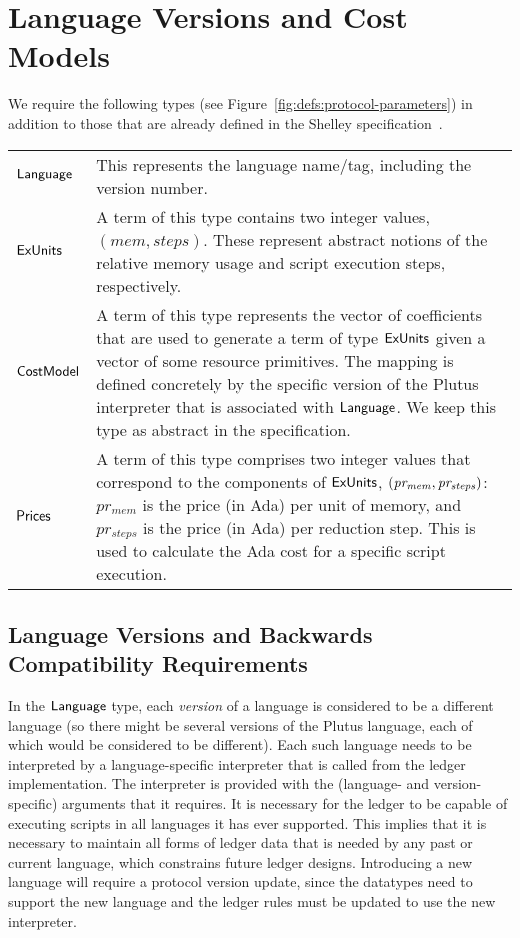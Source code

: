 \section{Language Versions and Cost Models}
\label{sec:protocol-parameters}

We require the following types (see Figure~\ref{fig:defs:protocol-parameters})
in addition to those that are already defined in the Shelley specification~\cite{shelley_spec}.

\vspace{12pt}
\begin{tabular}{lp{5in}}
  $\mathsf{Language}$ &
  This represents the language name/tag, including the
  version number.
  \\
  $\mathsf{ExUnits}$ &
  A term of this type contains two integer values,
  $(mem, steps)$.
  These represent abstract notions of the relative memory usage and script execution steps,
  respectively.
  \\
  $\mathsf{CostModel}$ &
  A term of this type represents the vector of coefficients that are used to generate
  a term of type $\mathsf{ExUnits}$ given a vector of some resource primitives. The mapping is defined
  concretely by the specific version of the Plutus interpreter that is associated with $\mathsf{Language}$.
  We keep this type as abstract in the specification.
  \\
  $\mathsf{Prices}$ &
  A term of this type comprises two integer values that correspond to the components of $\mathsf{ExUnits}$,
  $\mathit{(pr_{mem}, pr_{steps})}$:
  $pr_{mem}$ is the price (in Ada) per unit of memory, and $pr_{steps}$ is the price (in Ada) per
  reduction step. This is used to calculate the Ada cost for a specific script execution.
\end{tabular}

\subsection{Language Versions and Backwards Compatibility Requirements}
\label{sec:versions}

In the $\mathsf{Language}$ type, each \emph{version} of a language is considered to be a different language (so there might be several versions of the Plutus language, each of which would be considered to
be different).
Each such language needs to be interpreted by a language-specific interpreter that is called from the ledger implementation.
The interpreter is provided with the (language- and version-specific) arguments that it requires.
It is necessary for the ledger to be capable of executing scripts in all languages it has ever supported.
This implies that it is necessary to maintain all forms of ledger
data that is needed by any past or current language, which constrains future ledger designs.
Introducing a new language will require a protocol version update, since the datatypes need to support the new language and the ledger rules must be updated to use the new interpreter.

